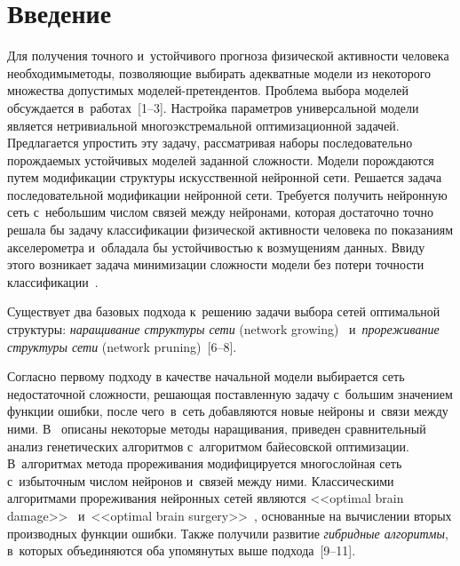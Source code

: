 
\vspace*{6pt}



\thispagestyle{headings}

\begin{multicols}{2}

\label{st\stat}



\section{Введение}

Для получения точного и~устойчивого прогноза физической активности
человека необходимы\linebreak методы, позволяющие выбирать адекватные модели
из некоторого множества допустимых моделей-пре\-тен\-ден\-тов. Проблема
выбора моделей об\-суж\-да\-ет\-ся в~работах~[1--3]. Настройка параметров\linebreak
универсальной модели является нетривиальной многоэкстремальной
оптимизационной задачей. Предлагается упростить эту задачу,
рассматривая наборы последовательно порождаемых устойчивых моделей
заданной сложности. Модели порождаются путем модификации структуры
искусственной нейронной сети. Решается задача последовательной
модификации нейронной сети. Требуется получить нейронную сеть
с~небольшим числом связей между нейронами, которая достаточно точно
решала бы задачу классификации физической активности человека по
показаниям акселерометра и~обладала бы устойчивостью к возмущениям
данных. Ввиду этого возникает задача минимизации сложности модели
без потери точности классификации~\cite{Myung2000Complexity}.

Существует два базовых подхода к~решению задачи выбора сетей
оптимальной структуры: \textit{наращивание структуры сети} (network
growing)~\cite{MacLeod2001Grow} и~\textit{прореживание структуры сети}
(network pruning)~[6--8].

Согласно первому подходу в качестве начальной модели выбирается сеть
недостаточной сложности, решающая поставленную задачу с~большим
значением функции ошибки, после чего~в~сеть добавляются новые
нейроны и~связи между ними. В~\cite{MacLeod2001Grow} описаны
некоторые методы наращивания, приведен сравнительный анализ
генетических алгоритмов с~алгоритмом байесовской оптимизации.
В~алгоритмах метода прореживания модифицируется многослойная сеть
с~избыточным числом нейронов и~связей между ними. Классическими
алгоритмами прореживания нейронных сетей являются <<optimal brain
damage>>~\cite{LeCun1990Optimal} и~<<optimal brain surgery>>~\cite{Hassibi93}, основанные на вычислении вторых производных
функции ошибки. Также получили развитие \textit{гибридные алгоритмы},
в~которых объединяются оба упомянутых выше подхода~[9--11].


\end{multicols}
